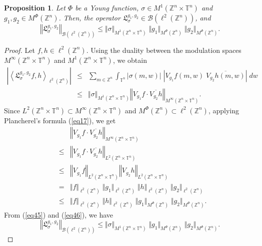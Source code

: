 \documentclass[a4paper,11pt, reqno]{amsart}
\theoremstyle{plain}
\newtheorem{proposition}[theorem]{Proposition}
\theoremstyle{definition}
\theoremstyle{remark}
\def \Z{{\mathbb Z}}
\def \T{{\mathbb T}}
\begin{document}
\begin{proposition}\label{pro1}
Let $\Phi$ be a Young function, $\sigma \in M^1(\Z^n \times \T^n)$ and $g_1, g_2 \in  M^{\Phi}(\Z^n)$. Then, the operator $\mathfrak{L}^{g_1, g_2}_{\sigma} \in \mathcal{B}(\ell^2(\Z^n))$, and 
$$\left\Vert \mathfrak{L}^{g_1, g_2}_{\sigma} \right\Vert_{\mathcal{B}(\ell^2(\Z^n))} \leq \Vert \sigma \Vert_{M^1(\Z^n \times \T^n)} \; \Vert g_1 \Vert_{M^{\Phi}(\Z^n)} \; \Vert g_2 \Vert_{M^{\Phi}(\Z^n)}. $$
\end{proposition}
\begin{proof}
Let $f , h \in \ell^2(\Z^n)$. Using the duality between the modulation spaces $M^\infty(\Z^n \times \T^n)$ and $M^1(\Z^n \times \T^n)$, we obtain
\begin{eqnarray}\label{eq45}
\left| \left\langle \mathfrak{L}^{g_1, g_2}_{\sigma}f, h \right\rangle_{\ell^2(\Z^n)} \right|   
& \leq & \sum_{m \in \Z^n}  \int_{\T^n} |\sigma(m, w)| \; \left|V_{g_1}f(m, w) \; \overline{V_{g_2}h(m, w)} \right|  \; dw \nonumber \\
& \leq & \Vert \sigma \Vert_{M^1(\Z^n \times \T^n)} \left\Vert V_{g_1}f \cdot \overline{V_{g_2}h} \right\Vert_{M^\infty(\Z^n \times \T^n)}.
\end{eqnarray}
Since $L^2(\Z^n \times \T^n) \subset M^\infty(\Z^n \times \T^n)$ and $M^{\Phi}(\Z^n) \subset \ell^2(\Z^n)$, applying Plancherel's formula (\ref{eq17}), we get 
\begin{eqnarray}\label{eq46}
&& \left\Vert V_{g_1}f \cdot \overline{V_{g_2}h} \right\Vert_{M^\infty(\Z^n \times \T^n)} \nonumber \\
& \leq & \left\Vert V_{g_1}f \cdot \overline{V_{g_2}h} \right\Vert_{L^2(\Z^n \times \T^n)} \nonumber \\
& \leq & \left\Vert V_{g_1}f \right\Vert_{L^2(\Z^n \times \T^n)} \left\Vert V_{g_2}h \right\Vert_{L^2(\Z^n \times \T^n)} \nonumber \\
& = & \Vert f \Vert_{\ell^2(\Z^n)} \; \Vert g_1 \Vert_{\ell^2(\Z^n)} \; \Vert h \Vert_{\ell^2(\Z^n)} \; \Vert g_2 \Vert_{\ell^2(\Z^n)} \nonumber \\
& \leq & \Vert f \Vert_{\ell^2(\Z^n)} \; \Vert h \Vert_{\ell^2(\Z^n)} \; \Vert g_1 \Vert_{M^{\Phi}(\Z^n)} \; \Vert g_2 \Vert_{M^{\Phi}(\Z^n)}.
\end{eqnarray}
From (\ref{eq45}) and (\ref{eq46}), we have
\[\left\Vert \mathfrak{L}^{g_1, g_2}_{\sigma} \right\Vert_{\mathcal{B}(\ell^2(\Z^n))} \leq \Vert \sigma \Vert_{M^1(\Z^n \times \T^n)} \;  \Vert g_1 \Vert_{M^{\Phi}(\Z^n)} \; \Vert g_2 \Vert_{M^{\Phi}(\Z^n)} .\]
\end{proof}
\end{document}
